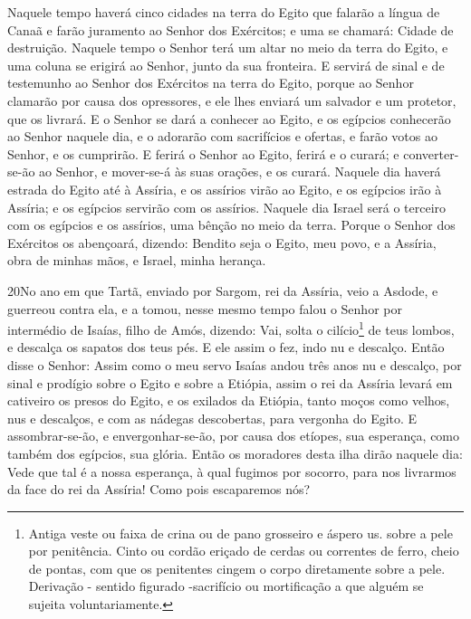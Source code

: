 Naquele tempo haverá cinco cidades na terra do Egito que falarão
a língua de Canaã e farão juramento ao Senhor dos Exércitos; e uma
se chamará: Cidade de destruição. Naquele tempo o Senhor terá
um altar no meio da terra do Egito, e uma coluna se erigirá ao
Senhor, junto da sua fronteira. E servirá de sinal e de
testemunho ao Senhor dos Exércitos na terra do Egito, porque ao
Senhor clamarão por causa dos opressores, e ele lhes enviará um
salvador e um protetor, que os livrará. E o Senhor se dará a
conhecer ao Egito, e os egípcios conhecerão ao Senhor naquele dia, e
o adorarão com sacrifícios e ofertas, e farão votos ao Senhor, e os
cumprirão. E ferirá o Senhor ao Egito, ferirá e o curará; e
converter-se-ão ao Senhor, e mover-se-á às suas orações, e os
curará. Naquele dia haverá estrada do Egito até à Assíria, e
os assírios virão ao Egito, e os egípcios irão à Assíria; e os
egípcios servirão com os assírios. Naquele dia Israel será o
terceiro com os egípcios e os assírios, uma bênção no meio da terra.
Porque o Senhor dos Exércitos os abençoará, dizendo: Bendito
seja o Egito, meu povo, e a Assíria, obra de minhas mãos, e Israel,
minha herança.

\medskip

\lettrine{20}{}No ano em que Tartã, enviado por Sargom, rei da
Assíria, veio a Asdode, e guerreou contra ela, e a tomou, nesse
mesmo tempo falou o Senhor por intermédio de Isaías, filho de Amós,
dizendo: Vai, solta o cilício\footnote{Antiga veste ou faixa de
crina ou de pano grosseiro e áspero us. sobre a pele por penitência.
Cinto ou cordão eriçado de cerdas ou correntes de ferro, cheio de
pontas, com que os penitentes cingem o corpo diretamente sobre a
pele. Derivação - sentido figurado -sacrifício ou mortificação a que
alguém se sujeita voluntariamente.} de teus lombos, e descalça os
sapatos dos teus pés. E ele assim o fez, indo nu e descalço.
Então disse o Senhor: Assim como o meu servo Isaías andou três
anos nu e descalço, por sinal e prodígio sobre o Egito e sobre a
Etiópia, assim o rei da Assíria levará em cativeiro os presos do
Egito, e os exilados da Etiópia, tanto moços como velhos, nus e
descalços, e com as nádegas descobertas, para vergonha do Egito.
E assombrar-se-ão, e envergonhar-se-ão, por causa dos etíopes,
sua esperança, como também dos egípcios, sua glória. Então os
moradores desta ilha dirão naquele dia: Vede que tal é a nossa
esperança, à qual fugimos por socorro, para nos livrarmos da face do
rei da Assíria! Como pois escaparemos nós?

\medskip

